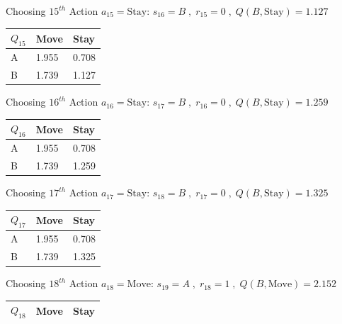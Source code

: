 \documentclass[a4paper]{article}
\theoremstyle{definition}
\newenvironment{soln}{
    \leavevmode\color{blue}\ignorespaces
}{}
\begin{document}
\begin{enumerate}
\begin{soln}
\begin{center}
\begin{tabular}{ | m{5em} | m{5em}| m{5em} |}
            \hline
            \end{tabular}
        \end{center}
Choosing $15^{th}$ Action $a_{15} = \text{Stay}$: $s_{16}=B\;,\;r_{15}=0\;,\;Q(B,\text{Stay}) = 1.127$
        \begin{center}
            \begin{tabular}{ | m{5em} | m{5em}| m{5em} |} 
            \hline
            $Q_{15}$ & Move & Stay \\ 
            \hline
            A & 1.955 & 0.708  \\
            \hline
            B & 1.739 & 1.127 \\ 
            \hline
            \end{tabular}
        \end{center}
Choosing $16^{th}$ Action $a_{16} = \text{Stay}$: $s_{17}=B\;,\;r_{16}=0\;,\;Q(B,\text{Stay}) = 1.259$
        \begin{center}
            \begin{tabular}{ | m{5em} | m{5em}| m{5em} |} 
            \hline
            $Q_{16}$ & Move & Stay \\ 
            \hline
            A & 1.955 & 0.708  \\
            \hline
            B & 1.739 & 1.259 \\ 
            \hline
            \end{tabular}
        \end{center}
Choosing $17^{th}$ Action $a_{17} = \text{Stay}$: $s_{18}=B\;,\;r_{17}=0\;,\;Q(B,\text{Stay}) = 1.325$
        \begin{center}
            \begin{tabular}{ | m{5em} | m{5em}| m{5em} |} 
            \hline
            $Q_{17}$ & Move & Stay \\ 
            \hline
            A & 1.955 & 0.708  \\
            \hline
            B & 1.739 & 1.325 \\ 
            \hline
            \end{tabular}
        \end{center}
Choosing $18^{th}$ Action $a_{18} = \text{Move}$: $s_{19}=A\;,\;r_{18}=1\;,\;Q(B,\text{Move}) = 2.152$
        \begin{center}
            \begin{tabular}{ | m{5em} | m{5em}| m{5em} |} 
            \hline
            $Q_{18}$ & Move & Stay \\ 
            \hline

\end{tabular}
\end{center}
\end{soln}
\end{enumerate}
\end{document}
